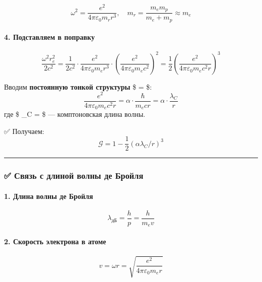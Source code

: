 \documentclass[11pt]{article}
\begin{document}
\[
\omega^2 = \frac{e^2}{4\pi\varepsilon_0 m_r r^3}, \quad m_r = \frac{m_e m_p}{m_e + m_p} \approx m_e
\]

\paragraph{4. Подставляем в
поправку}\label{ux43fux43eux434ux441ux442ux430ux432ux43bux44fux435ux43c-ux432-ux43fux43eux43fux440ux430ux432ux43aux443}

\[
\frac{\omega^2 r_e^2}{2c^2} = \frac{1}{2c^2} \cdot \frac{e^2}{4\pi\varepsilon_0 m_e r^3} \cdot \left( \frac{e^2}{4\pi\varepsilon_0 m_e c^2} \right)^2 = \frac{1}{2} \left( \frac{e^2}{4\pi\varepsilon_0 m_e c^2 r} \right)^3
\]

Вводим \textbf{постоянную тонкой структуры} \$ \alpha =
 \$: \[
\frac{e^2}{4\pi\varepsilon_0 m_e c^2 r} = \alpha \cdot \frac{\hbar}{m_e c r} = \alpha \cdot \frac{\lambda_C}{r}
\] где \$ \lambda\_C =  \$ --- комптоновская длина
волны.

✅ Получаем: \[
\mathcal{G} = 1 - \frac{1}{2} (\alpha \lambda_C / r)^3
\]

\begin{center}\rule{0.5\linewidth}{\linethickness}\end{center}

\subsubsection{✅ Связь с длиной волны де
Бройля}\label{ux441ux432ux44fux437ux44c-ux441-ux434ux43bux438ux43dux43eux439-ux432ux43eux43bux43dux44b-ux434ux435-ux431ux440ux43eux439ux43bux44f-1}

\paragraph{1. Длина волны де
Бройля}\label{ux434ux43bux438ux43dux430-ux432ux43eux43bux43dux44b-ux434ux435-ux431ux440ux43eux439ux43bux44f-1}

\[
\lambda_{\text{дБ}} = \frac{h}{p} = \frac{h}{m_e v}
\]

\paragraph{2. Скорость электрона в
атоме}\label{ux441ux43aux43eux440ux43eux441ux442ux44c-ux44dux43bux435ux43aux442ux440ux43eux43dux430-ux432-ux430ux442ux43eux43cux435}

\[
v = \omega r = \sqrt{\frac{e^2}{4\pi\varepsilon_0 m_e r}}
\]
\end{document}
